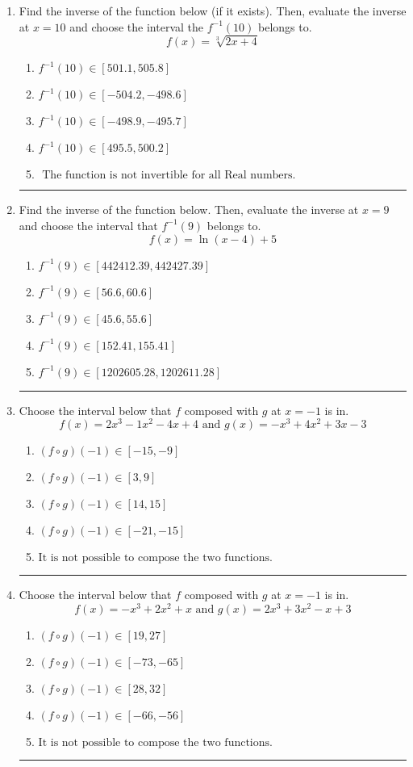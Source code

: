 \documentclass[14pt]{extbook}
\newcommand{\litem}[1]{\item#1\hspace*{-1cm}\rule{\textwidth}{0.4pt}}
\begin{document}
\begin{enumerate}
{\begin{enumerate}[label=\Alph*.]
\end{enumerate} }
\litem{
Find the inverse of the function below (if it exists). Then, evaluate the inverse at $x = 10$ and choose the interval the $f^{-1}(10)$ belongs to.\[ f(x) = \sqrt[3]{2 x + 4} \]\begin{enumerate}[label=\Alph*.]
\item \( f^{-1}(10) \in [501.1, 505.8] \)
\item \( f^{-1}(10) \in [-504.2, -498.6] \)
\item \( f^{-1}(10) \in [-498.9, -495.7] \)
\item \( f^{-1}(10) \in [495.5, 500.2] \)
\item \( \text{ The function is not invertible for all Real numbers. } \)

\end{enumerate} }
\litem{
Find the inverse of the function below. Then, evaluate the inverse at $x = 9$ and choose the interval that $f^{-1}(9)$ belongs to.\[ f(x) = \ln{(x-4)}+5 \]\begin{enumerate}[label=\Alph*.]
\item \( f^{-1}(9) \in [442412.39, 442427.39] \)
\item \( f^{-1}(9) \in [56.6, 60.6] \)
\item \( f^{-1}(9) \in [45.6, 55.6] \)
\item \( f^{-1}(9) \in [152.41, 155.41] \)
\item \( f^{-1}(9) \in [1202605.28, 1202611.28] \)

\end{enumerate} }
\litem{
Choose the interval below that $f$ composed with $g$ at $x=-1$ is in.\[ f(x) = 2x^{3} -1 x^{2} -4 x + 4 \text{ and } g(x) = -x^{3} +4 x^{2} +3 x -3 \]\begin{enumerate}[label=\Alph*.]
\item \( (f \circ g)(-1) \in [-15, -9] \)
\item \( (f \circ g)(-1) \in [3, 9] \)
\item \( (f \circ g)(-1) \in [14, 15] \)
\item \( (f \circ g)(-1) \in [-21, -15] \)
\item \( \text{It is not possible to compose the two functions.} \)

\end{enumerate} }
\litem{
Choose the interval below that $f$ composed with $g$ at $x=-1$ is in.\[ f(x) = -x^{3} +2 x^{2} +x \text{ and } g(x) = 2x^{3} +3 x^{2} -x + 3 \]\begin{enumerate}[label=\Alph*.]
\item \( (f \circ g)(-1) \in [19, 27] \)
\item \( (f \circ g)(-1) \in [-73, -65] \)
\item \( (f \circ g)(-1) \in [28, 32] \)
\item \( (f \circ g)(-1) \in [-66, -56] \)
\item \( \text{It is not possible to compose the two functions.} \)


\end{enumerate}}
\end{enumerate}
\end{document}
